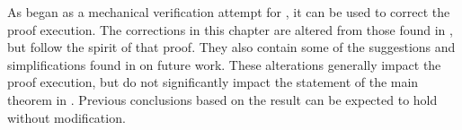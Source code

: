 As \TMmodelName{} began as a mechanical verification attempt for \TMSW{}, it can be used to correct the proof execution.
The corrections in this chapter are altered from those found in \TMmodelName{}, but follow the spirit of that proof.
They also contain some of the suggestions and simplifications found in  on future work.
These alterations generally impact the proof execution, but do not significantly impact the statement of the main theorem in \TMSW{}.
Previous conclusions based on the \TMSW{} result \cite{Shapiro03thepractical} can be expected to hold without modification.

\endgroup

